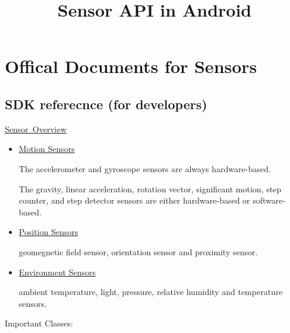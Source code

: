 \documentclass{article}
\title{Sensor API in Android}
\begin{document}
\section{Offical Documents for Sensors}

\subsection{SDK referecnce (for developers)}


\href{https://developer.android.com/guide/topics/sensors/sensors_overview.html#sensors-monitor} {Sensor~Overview}
\begin{itemize}
\item
  \href{https://developer.android.com/guide/topics/sensors/sensors_motion.html}
  {Motion Sensors}
  
  The accelerometer and gyroscope sensors are always hardware-based.
  
  The gravity, linear acceleration, rotation vector, significant motion, step
  counter, and step detector sensors are either hardware-based or
  software-based.
   
  
\item
  \href{https://developer.android.com/guide/topics/sensors/sensors_position.html}
  {Position Sensors}

  geomegnetic field sensor, orientation sensor and proximity sensor.

\item
  \href{https://developer.android.com/guide/topics/sensors/sensors_environment.html}
  {Environment Sensors}

  ambient temperature, light, pressure, relative humidity and temperature sensors.
\end{itemize}


Important Classes:
\end{document}
